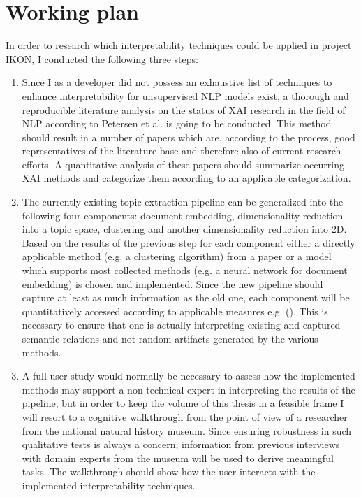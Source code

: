 \section{Working plan}
In order to research which interpretability techniques could be applied in project IKON, I conducted the following three steps:

\begin{enumerate}
	\item Since I as a developer did not possess an exhaustive list of techniques to enhance interpretability for unsupervised NLP models exist, a thorough and reproducible literature analysis on the status of XAI research in the field of NLP according to Petersen et al. \cite{petersenSystematicMappingStudies} is going to be conducted. This method should result in a number of papers which are, according to the process, good representatives of the literature base and therefore also of current research efforts. A quantitative analysis of these papers should summarize occurring XAI methods and categorize them according to an applicable categorization. 
	
	\item The currently existing topic extraction pipeline can be generalized into the following four components: document embedding, dimensionality reduction into a topic space, clustering and another dimensionality reduction into 2D. Based on the results of the previous step for each component either a directly applicable method (e.g. a clustering algorithm) from a paper or a model which supports most collected methods (e.g. a neural network for document embedding) is chosen and implemented. Since the new pipeline should capture at least as much information as the old one, each component will be quantitatively accessed according to applicable measures e.g. (\cite{roderExploringSpaceTopic2015a}). This is necessary to ensure that one is actually interpreting existing and captured semantic relations and not random artifacts generated by the various methods.
	
	\item A full user study would normally be necessary to assess how the implemented methods may support a non-technical expert in interpreting the results of the pipeline, but in order to keep the volume of this thesis in a feasible frame I will resort to a cognitive walkthrough from the point of view of a researcher from the national natural history museum.
	Since ensuring robustness in such qualitative tests is always a concern, information from previous interviews with domain experts from the museum will be used to derive meaningful tasks. The walkthrough should show how the user interacts with the implemented interpretability techniques.
\end{enumerate}

